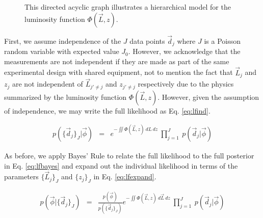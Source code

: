 \documentclass[preprint]{aastex}
\begin{document}
\begin{figure}
\vspace{0.5cm}
\begin{center}
\caption{This directed acyclic graph illustrates a hierarchical model for the luminosity function $\Phi(\vec{L},z)$.}
\label{fig:lf}
\end{center}
\end{figure}

First, we assume independence of the $J$ data points $\vec{d}_{j}$ where $J$ is a Poisson random variable with expected value $J_{0}$.  However, we acknowledge that the measurements are not independent if they are made as part of the same experimental design with shared equipment, not to mention the fact that $\vec{L}_{j}$ and $z_{j}$ are not independent of $\vec{L}_{j'\neq j}$ and $z_{j'\neq j}$ respectively due to the physics summarized by the luminosity function $\Phi(\vec{L},z)$.  However, given the assumption of independence, we may write the full likelihood as Eq. \ref{eq:lfind}.  

\begin{eqnarray}
\label{eq:lfind}
p(\{\vec{d}_{j}\}_{J}|\vec{\phi}) &=& e^{-\iint \Phi(\vec{L},z)\ dL\ dz}\ \prod_{j=1}^{J}\ p(\vec{d}_{j}|\vec{\phi})
\end{eqnarray}

As before, we apply Bayes' Rule to relate the full likelihood to the full posterior in Eq. \ref{eq:lfbayes} and expand out the individual likelihood in terms of the parameters $\{\vec{L}_{j}\}_{J}$ and $\{z_{j}\}_{J}$ in Eq. \ref{eq:lfexpand}.

\begin{eqnarray}
\label{eq:lfbayes}
p(\vec{\phi}|\{\vec{d}_{j}\}_{J}) &=& \frac{p(\vec{\phi})}{p(\{\vec{d}_{j}\}_{J})}e^{-\iint \Phi(\vec{L},z)\ d\vec{L}\ dz}\ \prod_{j=1}^{J}\ p(\vec{d}_{j}|\vec{\phi})
\end{eqnarray}
\end{document}
